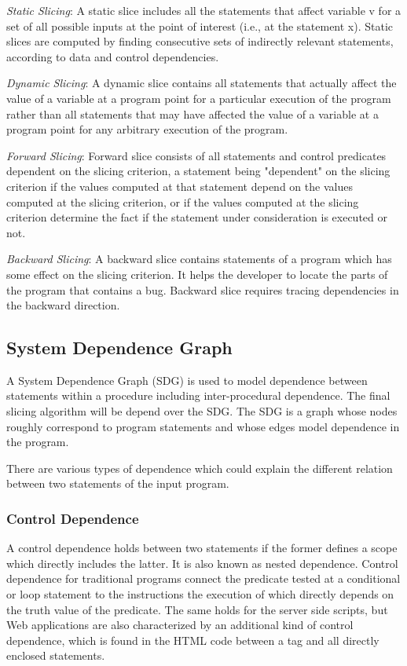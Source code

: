 \documentclass[11pt]{article}   %
\begin{document}
\emph{Static Slicing}:
A static slice includes all the statements that affect variable v for a set of all possible inputs at the point of interest (i.e., at the statement x). Static slices are computed by finding consecutive sets of indirectly relevant statements, according to data and control dependencies.

\emph{Dynamic Slicing}:
A dynamic slice contains all statements that actually affect the value of a variable at a program point for a particular execution of the program rather than all statements that may have affected the value of a variable at a program point for any arbitrary execution of the program.

\emph{Forward Slicing}:
Forward slice consists of all statements and control predicates dependent on the slicing criterion, a statement being "dependent" on the slicing criterion if the values computed at that statement depend on the values computed at the slicing criterion, or if the values computed at the slicing criterion determine the fact if the statement under consideration is executed or not.

\emph{Backward Slicing}:
A backward slice contains statements of a program which has some effect on the slicing criterion. It helps the developer to locate the parts of the program that contains a bug. Backward slice requires tracing dependencies in the backward direction.

\subsection{System Dependence Graph}
A System Dependence Graph (SDG) is used to model dependence between statements within a procedure including inter-procedural dependence. The final slicing algorithm will be depend over the SDG. 
The SDG is a graph whose nodes roughly correspond to program statements and whose edges model dependence in the program.

There are various types of dependence which could explain the different relation between two statements of the input program.
\subsubsection{Control Dependence}
A control dependence holds between two statements if the former defines a scope which directly includes the latter. It is also known as nested dependence.
Control dependence for traditional programs connect the predicate tested at a conditional or loop statement to the instructions the execution of which directly depends on the truth value of the predicate. The same holds for the server side scripts, but Web applications are also characterized by an additional kind of control dependence, which is found in the HTML code between a tag and all directly enclosed statements\cite{ricca2001web}.
\end{document}
